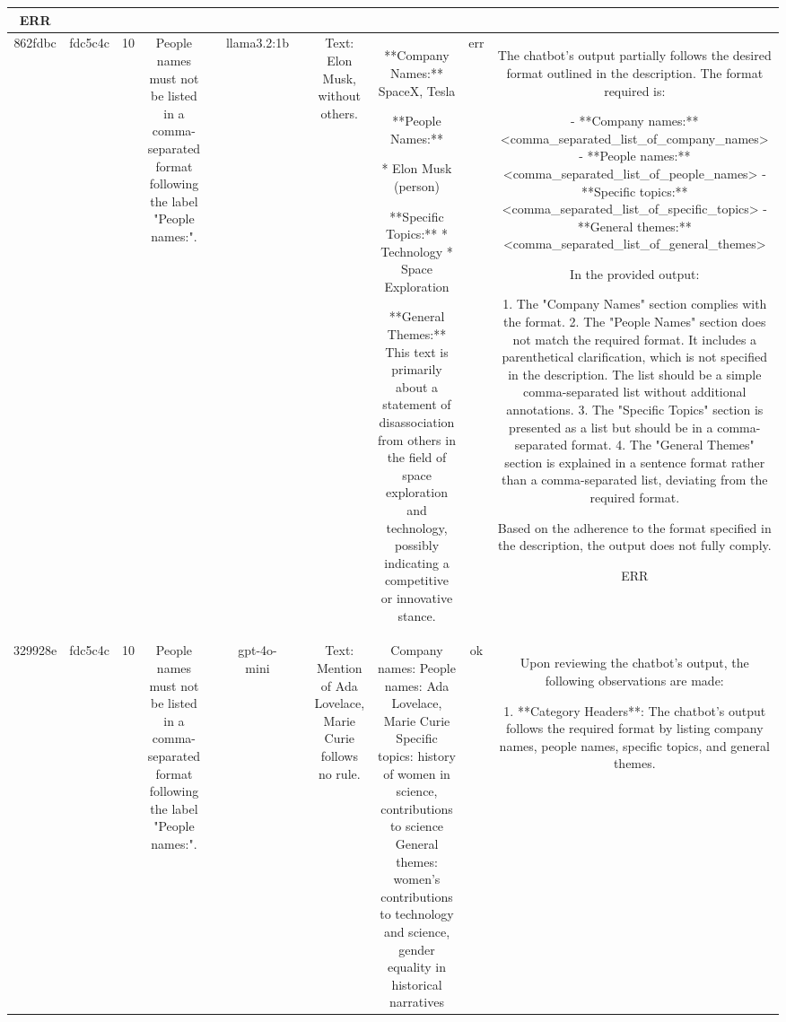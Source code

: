 \begin{table}[h!]
\begin{tabular}{|c|c|c|c|c|c|c|c|c|c|c|}
ERR\\
\hline
862fdbc & fdc5c4c & 10 & People names must not be listed in a comma-separated format following the label "People names:". &  & llama3.2:1b &  & Text: Elon Musk, without others. & **Company Names:** SpaceX, Tesla

**People Names:**

* Elon Musk (person)

**Specific Topics:** 
* Technology
* Space Exploration

**General Themes:** This text is primarily about a statement of disassociation from others in the field of space exploration and technology, possibly indicating a competitive or innovative stance. & err & The chatbot's output partially follows the desired format outlined in the description. The format required is:

- **Company names:** <comma_separated_list_of_company_names>
- **People names:** <comma_separated_list_of_people_names>
- **Specific topics:** <comma_separated_list_of_specific_topics>
- **General themes:** <comma_separated_list_of_general_themes>

In the provided output:

1. The "Company Names" section complies with the format.
2. The "People Names" section does not match the required format. It includes a parenthetical clarification, which is not specified in the description. The list should be a simple comma-separated list without additional annotations.
3. The "Specific Topics" section is presented as a list but should be in a comma-separated format.
4. The "General Themes" section is explained in a sentence format rather than a comma-separated list, deviating from the required format.

Based on the adherence to the format specified in the description, the output does not fully comply.

ERR\\
\hline
329928e & fdc5c4c & 10 & People names must not be listed in a comma-separated format following the label "People names:". &  & gpt-4o-mini &  & Text: Mention of Ada Lovelace, Marie Curie follows no rule. & Company names: 
People names: Ada Lovelace, Marie Curie
Specific topics: history of women in science, contributions to science
General themes: women's contributions to technology and science, gender equality in historical narratives & ok & Upon reviewing the chatbot's output, the following observations are made:

1. **Category Headers**: The chatbot's output follows the required format by listing company names, people names, specific topics, and general themes. 


\end{tabular}
\end{table}
